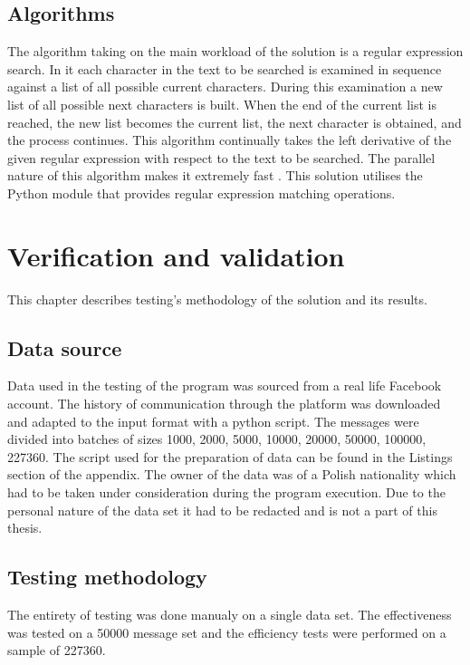 \documentclass[a4paper,twoside,12pt]{book}
\begin{document}
\section{Algorithms}

The algorithm taking on the main workload of the solution is a regular expression search. In it each character in the text to be searched is examined in sequence against a 
list of all possible current characters. During this examination a new list of all possible next characters is built. When the end of the current list is reached, the new list becomes the current list, the next 
character is obtained, and the process continues. This algorithm continually takes the left derivative of the given regular expression with respect to the text to be searched. The parallel nature of this algorithm 
makes it extremely fast \cite{bib:articleRE}. This solution utilises the Python module that provides regular expression matching operations.

\chapter{Verification and validation}

This chapter describes testing's methodology of the solution and its results.

\section{Data source}

Data used in the testing of the program was sourced from a real life Facebook account. The history of communication through the platform was downloaded and adapted to the input format with a python script.
The messages were divided into batches of sizes 1000, 2000, 5000, 10000, 20000, 50000, 100000, 227360. The script used for the preparation of data can be found in the Listings section of the appendix.
The owner of the data was of a Polish nationality which had to be taken under consideration during the program execution. Due to the personal nature of the data set it had to be 
redacted and is not a part of this thesis.

\section{Testing methodology}

The entirety of testing was done manualy on a single data set. The effectiveness was tested on a 50000 message set and
the efficiency tests were performed on a sample of 227360.
\end{document}
